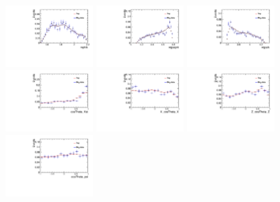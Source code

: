 \begin{figure}[!hbtp]
\centering
\includegraphics[width=0.3\textwidth]{Figures/03_Zcs/app_sideband/mphik.pdf}  %
\includegraphics[width=0.3\textwidth]{Figures/03_Zcs/app_sideband/mjpsiphi.pdf}  %
\includegraphics[width=0.3\textwidth]{Figures/03_Zcs/app_sideband/mjpsik.pdf} \\
\includegraphics[width=0.3\textwidth]{Figures/03_Zcs/app_sideband/cosTheta_Kst.pdf}%
\includegraphics[width=0.3\textwidth]{Figures/03_Zcs/app_sideband/X_cosTheta_X.pdf}%
\includegraphics[width=0.3\textwidth]{Figures/03_Zcs/app_sideband/Z_cosTheta_Z.pdf} \\%
\includegraphics[width=0.3\textwidth]{Figures/03_Zcs/app_sideband/cosTheta_psi.pdf}%

\end{figure}
